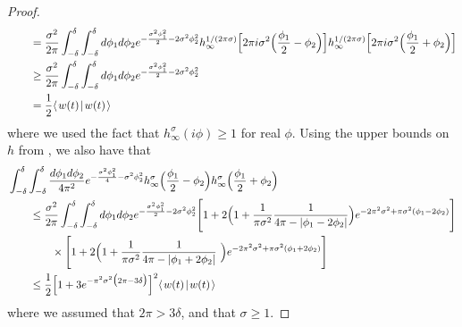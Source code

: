 \documentclass[../thesis-main/thesis-main]{subfiles}
\begin{document}
\begin{proof}
\begin{align}
  & \qquad =  \frac{\sigma^2}{2\pi} \int_{-\delta}^\delta \int_{-\delta}^\delta d\phi_1 d\phi_2 e^{ -\frac{\sigma^2 \phi_1^2}{2} - 2\sigma^2 \phi_2^2} h_\infty^{1/(2\pi \sigma)} \Big[2 \pi i \sigma^2 \Big(\frac{\phi_1}{2} - \phi_2 \Big)\Big]h_\infty^{1/(2\pi \sigma)} \Big[2 \pi i \sigma^2 \Big(\frac{\phi_1}{2} +\phi_2 \Big)\Big]\\
 & \qquad \geq \frac{\sigma^2}{2\pi} \int_{-\delta}^\delta \int_{-\delta}^\delta d\phi_1 d\phi_2 e^{ -\frac{\sigma^2 \phi_1^2}{2} - 2\sigma^2 \phi_2^2}\\
 & \qquad = \frac{1}{2} \langle\mspace{2mu} w(t) \mspace{2mu} | \mspace{2mu} w(t)\mspace{2mu} \rangle
\end{align}
where we used the fact that $h_\infty^\sigma(i \phi) \geq 1$ for real $\phi$.  Using the upper bounds on $h$ from , we also have that
\begin{align}
&\int_{-\delta}^\delta \int_{-\delta}^{\delta} \frac{ d\phi_1 d\phi_2}{4\pi^2} e^{ - \frac{\sigma^2\phi_1^2}{4} - \sigma^2 \phi_2^2} h_\infty^\sigma \Big(\frac{\phi_1}{2} - \phi_2\Big) h_\infty^\sigma \Big( \frac{\phi_1}{2} + \phi_2\Big)\nonumber\\
& \qquad \leq \frac{\sigma^2}{2\pi} \int_{-\delta}^\delta \int_{-\delta}^\delta d\phi_1 d\phi_2 e^{ -\frac{\sigma^2 \phi_1^2}{2} - 2\sigma^2 \phi_2^2} \Bigg[1 + 2 \Big(1 + \frac{ 1}{\pi \sigma^2} \frac{1}{4 \pi -  | \phi_1 - 2\phi_2|} \Big)e^{-2\pi^2 \sigma^2 + \pi \sigma^2 (\phi_1 - 2 \phi_2)} \Bigg]\nonumber\\
& \qquad \qquad \times   \Bigg[1 + 2 \Big(1 + \frac{ 1}{\pi \sigma^2} \frac{1}{4 \pi -  | \phi_1+ 2\phi_2|} \ \Big)e^{-2\pi^2 \sigma^2 +   \pi \sigma^2 (\phi_1 + 2 \phi_2)} \Bigg]\\
& \qquad \leq \frac{1}{2} \Big[1 + 3 e^{ -  \pi^2 \sigma^2 \big(2 \pi - 3\delta\big)} \Big]^2  \langle\mspace{2mu} w(t) \mspace{2mu} | \mspace{2mu} w(t)\mspace{2mu} \rangle
\end{align}
where we assumed that $2\pi > 3 \delta$, and that $\sigma \geq 1$. 


\end{proof}
\end{document}
